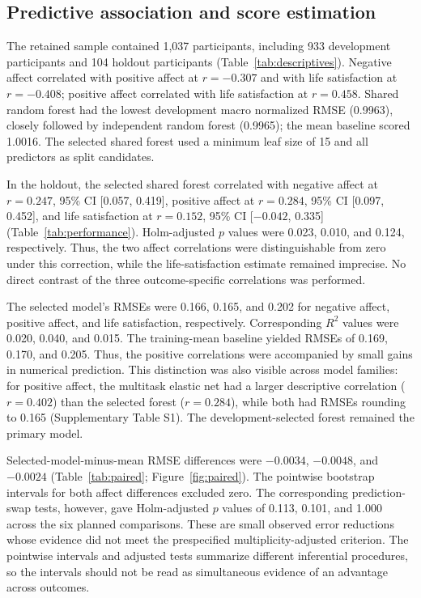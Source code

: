 \subsection{Predictive association and score estimation}
The retained sample contained 1,037 participants, including 933 development participants and 104 holdout participants (Table~\ref{tab:descriptives}). Negative affect correlated with positive affect at $r=-0.307$ and with life satisfaction at $r=-0.408$; positive affect correlated with life satisfaction at $r=0.458$. Shared random forest had the lowest development macro normalized RMSE (0.9963), closely followed by independent random forest (0.9965); the mean baseline scored 1.0016. The selected shared forest used a minimum leaf size of 15 and all predictors as split candidates.



In the holdout, the selected shared forest correlated with negative affect at $r=0.247$, 95\% CI [0.057, 0.419], positive affect at $r=0.284$, 95\% CI [0.097, 0.452], and life satisfaction at $r=0.152$, 95\% CI [$-0.042$, 0.335] (Table~\ref{tab:performance}). Holm-adjusted $p$ values were 0.023, 0.010, and 0.124, respectively. Thus, the two affect correlations were distinguishable from zero under this correction, while the life-satisfaction estimate remained imprecise. No direct contrast of the three outcome-specific correlations was performed.



The selected model's RMSEs were 0.166, 0.165, and 0.202 for negative affect, positive affect, and life satisfaction, respectively. Corresponding $R^2$ values were 0.020, 0.040, and 0.015. The training-mean baseline yielded RMSEs of 0.169, 0.170, and 0.205. Thus, the positive correlations were accompanied by small gains in numerical prediction. This distinction was also visible across model families: for positive affect, the multitask elastic net had a larger descriptive correlation ($r=0.402$) than the selected forest ($r=0.284$), while both had RMSEs rounding to 0.165 (Supplementary Table S1). The development-selected forest remained the primary model.

Selected-model-minus-mean RMSE differences were $-0.0034$, $-0.0048$, and $-0.0024$ (Table~\ref{tab:paired}; Figure~\ref{fig:paired}). The pointwise bootstrap intervals for both affect differences excluded zero. The corresponding prediction-swap tests, however, gave Holm-adjusted $p$ values of 0.113, 0.101, and 1.000 across the six planned comparisons. These are small observed error reductions whose evidence did not meet the prespecified multiplicity-adjusted criterion. The pointwise intervals and adjusted tests summarize different inferential procedures, so the intervals should not be read as simultaneous evidence of an advantage across outcomes.

